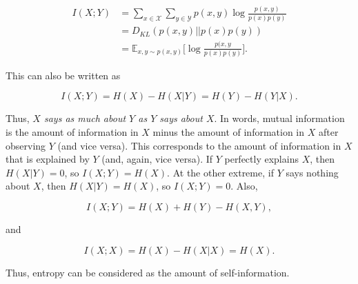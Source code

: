 \begin{align*}
	I(X; Y) &= \sum_{x \in \mathcal{X}} \sum_{y \in \mathcal{Y}} p(x, y) \log \frac{p(x, y)}{p(x) p(y)} \\
	           &= D_{KL} (p(x, y) || p(x) p(y)) \\
	           &= \mathbb{E}_{x, y \sim p(x, y)} \Big[ \log \frac{p(x, y}{p(x) p(y)} \Big].
\end{align*}

\noindent This can also be written as

\begin{equation}
	I(X; Y) = H(X) - H(X | Y) = H(Y) - H(Y | X).
\end{equation}

\noindent Thus, \textit{$X$ says as much about $Y$ as $Y$ says about $X$}. In words, mutual information is the amount of information in $X$ minus the amount of information in $X$ after observing $Y$ (and vice versa). This corresponds to the amount of information in $X$ that is explained by $Y$ (and, again, vice versa). If $Y$ perfectly explains $X$, then $H(X | Y) = 0$, so $I(X; Y) = H(X)$. At the other extreme, if $Y$ says nothing about $X$, then $H(X | Y) = H(X)$, so $I(X; Y) = 0$. Also, 

\begin{equation}
	I(X; Y) = H(X) + H(Y) - H(X, Y),
\end{equation}

\noindent and

\begin{equation}
	I(X; X) = H(X) - H(X | X) = H(X).
\end{equation}

\noindent Thus, entropy can be considered as the amount of self-information.
















